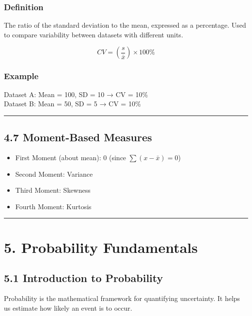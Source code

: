 \documentclass[
  letterpaper,
  DIV=11,
  numbers=noendperiod]{scrreprt}
\providecommand{\tightlist}{%
  \setlength{\itemsep}{0pt}\setlength{\parskip}{0pt}}
\begin{document}
\subsubsection{Definition}\label{definition-4}

The ratio of the standard deviation to the mean, expressed as a
percentage. Used to compare variability between datasets with different
units.

\[
CV = \left( \frac{s}{\bar{x}} \right) \times 100\%
\]

\subsubsection{Example}\label{example-5}

Dataset A: Mean = 100, SD = 10 → CV = 10\%\\
Dataset B: Mean = 50, SD = 5 → CV = 10\%

\begin{center}\rule{0.5\linewidth}{0.5pt}\end{center}

\subsection{4.7 Moment-Based Measures}\label{moment-based-measures}

\begin{itemize}
\tightlist
\item
  First Moment (about mean): 0 (since \(\sum (x - \bar{x}) = 0\))
\item
  Second Moment: Variance
\item
  Third Moment: Skewness
\item
  Fourth Moment: Kurtosis
\end{itemize}

\begin{center}\rule{0.5\linewidth}{0.5pt}\end{center}

\section{5. Probability Fundamentals}\label{probability-fundamentals}

\subsection{5.1 Introduction to
Probability}\label{introduction-to-probability}

Probability is the mathematical framework for quantifying uncertainty.
It helps us estimate how likely an event is to occur.
\end{document}
